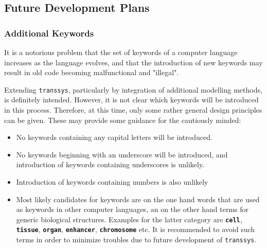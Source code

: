 \documentclass[12pt]{article}
\newcommand{\transsys}{\texttt{transsys}}
\newcommand{\keyword}[1]{\textbf{\texttt{#1}}}
\begin{document}
\subsection{Future Development Plans}
\label{future_plans}

\subsubsection{Additional Keywords}

It is a notorious problem that the set of keywords of a computer
language increases as the language evolves, and that the introduction
of new keywords may result in old code becoming malfunctional and
"illegal".

Extending \transsys{}, particularly by integration of additional
modelling methods, is definitely intended. However, it is not clear
which keywords will be introduced in this process. Therefore, at this
time, only some rather general design principles can be given. These
may provide some guidance for the cautiously minded:
\begin{itemize}
\item No keywords containing any capital letters will be introduced.
\item No keywords beginning with an underscore will be introduced, and
  introduction of keywords containing underscores is unlikely.
\item Introduction of keywords containing numbers is also unlikely
\item Most likely candidates for keywords are on the one hand words
  that are used as keywords in other computer languages, an on the
  other hand terms for generic biological structures. Examples for the
  latter category are \keyword{cell}, \keyword{tissue},
  \keyword{organ}, \keyword{enhancer}, \keyword{chromosome} etc. It is
  recommended to avoid such terms in order to minimize troubles due to
  future development of \transsys{}.
\end{itemize}
\end{document}
